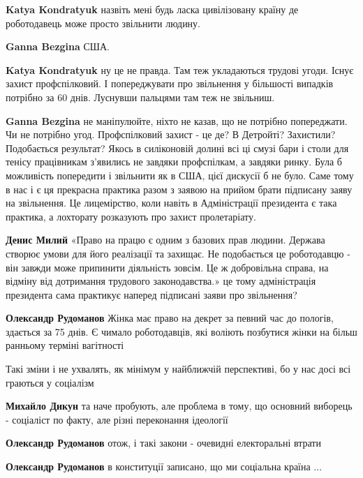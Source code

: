 \begin{itemize}
\begin{itemize}
\textbf{Katya Kondratyuk} назвіть мені будь ласка цивілізовану країну де роботодавець може просто звільнити людину.

\textbf{Ganna Bezgina} США.

\textbf{Katya Kondratyuk} ну це не правда. Там теж укладаються трудові угоди. Існує захист профспілковий. І попереджувати про звільнення у більшості випадків потрібно за 60 днів. Луснувши пальцями там теж не звільниш.

\textbf{Ganna Bezgina} не маніпулюйте, ніхто не казав, що не потрібно попереджати. Чи не потрібно угод.
Профспілковий захист - це де? В Детройті? Захистили? Подобається результат? Якось в силіконовій долині всі ці смузі бари і столи для тенісу працівникам з’явились не завдяки профспілкам, а завдяки ринку.
Була б можливість попередити і звільнити як в США, цієї дискусії б не було. Саме тому в нас і є ця прекрасна практика разом з заявою на прийом брати підписану заяву на звільнення. Це лицемірство, коли навіть в Адміністрації президента є така практика, а лохторату розказують про захист пролетаріату.

\textbf{Денис Милий} «Право на працю є одним з базових прав людини. Держава створює умови для його реалізації та захищає. Не подобається це роботодавцю - він завжди може припинити діяльність зовсім. Це ж добровільна справа, на відміну від дотримання трудового законодавства.» це тому адміністрація президента сама практикує наперед підписані заяви про звільнення?

\textbf{Олександр Рудоманов} Жінка має право на декрет за певний час до пологів, здається за 75 днів. Є чимало роботодавців, які воліють позбутися жінки на більш ранньому терміні вагітності

\end{itemize} %

Такі зміни і не ухвалять, як мінімум у найближчій перспективі, бо у нас досі всі граються у соціалізм

\begin{itemize} %
\textbf{Михайло Дикун} та наче пробують, але проблема в тому, що основний виборець - соціаліст по факту, але різні переконання ідеології

\textbf{Олександр Рудоманов} отож, і такі закони - очевидні електоральні втрати

\textbf{Олександр Рудоманов} в конституції записано, що ми соціальна країна ...


\end{itemize}
\end{itemize}
